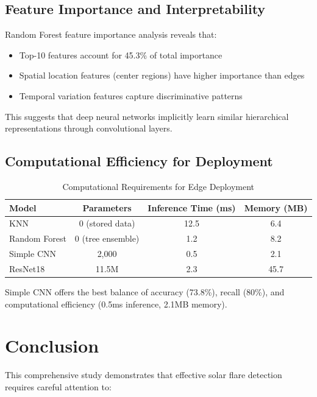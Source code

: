 \documentclass[11pt,a4paper]{article}
\begin{document}
\subsection{Feature Importance and Interpretability}

Random Forest feature importance analysis reveals that:

\begin{itemize}
    \item Top-10 features account for 45.3\% of total importance
    \item Spatial location features (center regions) have higher importance than edges
    \item Temporal variation features capture discriminative patterns
\end{itemize}

This suggests that deep neural networks implicitly learn similar hierarchical representations through convolutional layers.

\subsection{Computational Efficiency for Deployment}

\begin{table}[H]
\centering
\begin{tabular}{|l|c|c|c|}
\hline
\textbf{Model} & \textbf{Parameters} & \textbf{Inference Time (ms)} & \textbf{Memory (MB)} \\
\hline
KNN & 0 (stored data) & 12.5 & 6.4 \\
Random Forest & 0 (tree ensemble) & 1.2 & 8.2 \\
Simple CNN & 2,000 & 0.5 & 2.1 \\
ResNet18 & 11.5M & 2.3 & 45.7 \\
\hline
\end{tabular}
\caption{Computational Requirements for Edge Deployment}
\end{table}

Simple CNN offers the best balance of accuracy (73.8\%), recall (80\%), and computational efficiency (0.5ms inference, 2.1MB memory).

\section{Conclusion}

This comprehensive study demonstrates that effective solar flare detection requires careful attention to:
\end{document}
